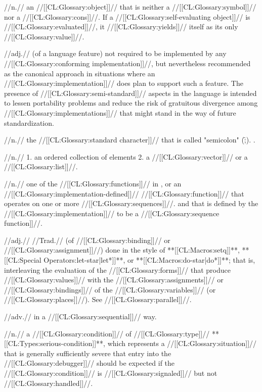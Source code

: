  //n.// an //[[CL:Glossary:object]]// that is neither a //[[CL:Glossary:symbol]]// nor a //[[CL:Glossary:cons]]//. If a //[[CL:Glossary:self-evaluating object]]// is //[[CL:Glossary:evaluated]]//, it //[[CL:Glossary:yields]]// itself as its only //[[CL:Glossary:value]]//. 

 //adj.// (of a language feature) not required to be implemented by any //[[CL:Glossary:conforming implementation]]//, but nevertheless recommended as the canonical approach in situations where an //[[CL:Glossary:implementation]]// does plan to support such a feature. The presence of //[[CL:Glossary:semi-standard]]// aspects in the language is intended to lessen portability problems and reduce the risk of gratuitous divergence among //[[CL:Glossary:implementations]]// that might stand in the way of future standardization.

 //n.// the //[[CL:Glossary:standard character]]// that is called "semicolon" (\f{;}). \Seefigure\StdCharsThree.

 //n.// 1. an ordered collection of elements 2. a //[[CL:Glossary:vector]]// or a //[[CL:Glossary:list]]//.

 //n.// one of the //[[CL:Glossary:functions]]// in \figref\SequenceFunctions, or an //[[CL:Glossary:implementation-defined]]// //[[CL:Glossary:function]]// that operates on one or more //[[CL:Glossary:sequences]]//. and that is defined by the //[[CL:Glossary:implementation]]// to be a //[[CL:Glossary:sequence function]]//.

 //adj.// //Trad.// (of //[[CL:Glossary:binding]]// or //[[CL:Glossary:assignment]]//) done in the style of **[[CL:Macros:setq]]**, **[[CL:Special Operators:let-star|let*]]**, or **[[CL:Macros:do-star|do*]]**; that is, interleaving the evaluation of the //[[CL:Glossary:forms]]// that produce //[[CL:Glossary:values]]// with the //[[CL:Glossary:assignments]]// or //[[CL:Glossary:bindings]]// of the //[[CL:Glossary:variables]]// (or //[[CL:Glossary:places]]//). See //[[CL:Glossary:parallel]]//.

 //adv.// in a //[[CL:Glossary:sequential]]// way.

 //n.// a //[[CL:Glossary:condition]]// of //[[CL:Glossary:type]]// **[[CL:Types:serious-condition]]**, which represents a //[[CL:Glossary:situation]]// that is generally sufficiently severe that entry into the //[[CL:Glossary:debugger]]// should be expected if the //[[CL:Glossary:condition]]// is //[[CL:Glossary:signaled]]// but not //[[CL:Glossary:handled]]//.

